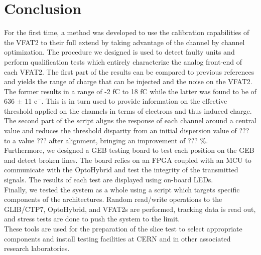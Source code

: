   \section{Conclusion}

    For the first time, a method was developed to use the calibration capabilities of the VFAT2 to their full extend by taking advantage of the channel by channel optimization. The procedure we designed is used to detect faulty units and perform qualification tests which entirely characterize the analog front-end of each VFAT2. The first part of the results can be compared to previous references and yields the range of charge that can be injected and the noise on the VFAT2. The former results in a range of -2 fC to 18 fC while the latter was found to be of 636 $\pm$ 11 e$^-$. This is in turn used to provide information on the effective threshold applied on the channels in terms of electrons and thus induced charge. The second part of the script aligns the response of each channel around a central value and reduces the threshold disparity from an initial dispersion value of ??? to a value ??? after alignment, bringing an improvement of ??? \%. \\


    Furthermore, we designed a GEB testing board to test each position on the GEB and detect broken lines. The board relies on an FPGA coupled with an MCU to communicate with the OptoHybrid and test the integrity of the transmitted signals. The results of each test are displayed using on-board LEDs. \\

    Finally, we tested the system as a whole using a script which targets specific components of the architectures. Random read/write operations to the GLIB/CTP7, OptoHybrid, and VFAT2s are performed, tracking data is read out, and stress tests are done to push the system to the limit. \\

    These tools are used for the preparation of the slice test to select appropriate components and install testing facilities at CERN and in other associated research laboratories.
